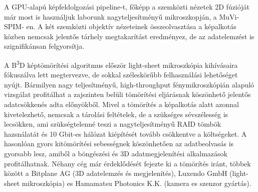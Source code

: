 \documentclass{booklet_style}
\def\b3d{B\textsuperscript{3}D}
\begin{document}
A GPU-alapú képfeldolgozási pipeline-t, főképp a szemközti nézetek 2D fúzióját már most is használjuk laborunk nagyteljesítményű mikroszkopján, a MuVi-SPIM- en. A két szemközti objektív nézeteinek összeolvasztása a képalkotás közben nemcsak jelentős tárhely megtakarítást eredményez, de az adatelemzést is szignifikánsan felgyorsítja.

A \b3d képtömörítési algoritmus először light-sheet mikroszkópia kihívásaira fókuszálva lett megtervezve, de sokkal széleskörűbb felhasználási lehetőséget nyújt. Bármilyen nagy teljesítményű, high-throughput fénymikroszkópián alapuló vizsgálat profitálhat a zajszinten belüli tömörítési eljárásnak köszönhető jelentős adatcsökkenés adta előnyökből. Mivel a tömörítés a képalkotás alatt azonnal kivetelezhető, nemcsak a tárolási feltételek, de a szükséges sévszélesség is lecsökken, ami szükségtelenné teszi a nagyteljesítményű RAID tömbök hazsnálatát és 10 Gbit-es hálózat kiépítését tovább csökkentve a költségeket. A hasonlóan gyors kitömörítési sebességnek köszönhetően az
adatbeolvasás is gyorsabb lesz, amiből a böngészési és 3D adatmegjelenítési alkalmazások profitálhatnak. Néhany cég már érdeklődését fejezte ki a tömörítés iránt, többek között a Bitplane AG (3D adatelemzés és megjelenítés), Luxendo GmbH (light-sheet mikroszkópia) es Hamamatsu Photonics K.K. (kamera es szenzor gyártás).





\printbibliography[category=journal, title={A szerző közleményei a témában}, heading=secbib]

\nocite{jakus_genetic_2010,gyorffy_recurrenceonline:_2011,shi_combined_2014}
\printbibliography[category=others, title={A szerző további közleményei}, heading=secbib, resetnumbers=5]

\printbibliography[category=conference, title={A szerző konferencia előadásai}, heading=secbib]

\newrefcontext
\printbibliography[notcategory=journal,notcategory=conference,notcategory=others, resetnumbers=true, title={Refernciák}, heading=secbib]


\end{document}
